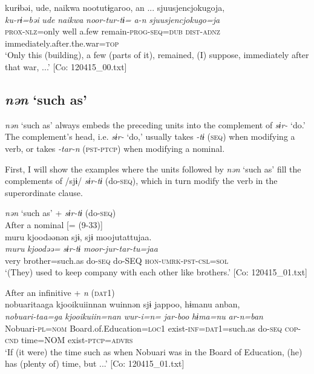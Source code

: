   \ex  %
      \glll    kurɨbəi,  ude,  naikwa  nootutɨgaroo,  an ...  {\textbar}sjuusjencjokugo{\textbar}ja,\\
      \textit{ku-rɨ=bəi}  \textit{ude}  \textit{naikwa}  \textit{noor-tur-tɨ=}  \textit{a-n} {} \textit{sjuusjencjokugo=ja}\\
      \textsc{prox}-\textsc{nlz}=only  well  a.few  remain-\textsc{prog}-\textsc{seq}=\textsc{dub} {} \textsc{dist}-\textsc{adnz}  immediately.after.the.war=\textsc{top}        \\
      \glt       ‘Only this (building), a few (parts of it), remained, (I) suppose, immediately after that war, ...’ [Co: 120415\_00.txt]
    \z
\z

\subsection{\textit{nən} ‘such as’}\label{sec:10.4.4}

\textit{nən} ‘such as’ always embeds the preceding units into the complement of \textit{sɨr-} ‘do.’ The complement’s head, i.e. \textit{sɨr-} ‘do,’ usually takes \textit{{}-tɨ} (\textsc{seq}) when modifying a verb, or takes \textit{-tar-n} (\textsc{pst}-\textsc{ptcp}) when modifying a nominal.

  First, I will show the examples where the units followed by \textit{nən} ‘such as’ fill the complements of /sjɨ/ \textit{sɨr-tɨ} (do-\textsc{seq}), which in turn modify the verb in the superordinate clause.

\ea\label{ex:10.85}   \textit{nən} ‘such as’ + \textit{sɨr-tɨ} (do-\textsc{seq})\\
  \ea After a nominal [= (9-33)]\\
      \glll    muru  kjoodəənən  sjɨ,  sjɨ  moojutattujaa.\\
    \textit{muru}  \textit{kjoodəə=}  \textit{}  \textit{sɨr-tɨ}  \textit{moor-jur-tar-tu=jaa}\\
    very  brother=such.as  do-\textsc{seq}  do-SEQ  \textsc{hon}-\textsc{umrk}-\textsc{pst}-\textsc{csl}=\textsc{sol}\\
\glt     ‘(They) used to keep company with each other like brothers.’  [Co: 120415\_01.txt]

  \ex After an infinitive + \textit{n} (\textsc{dat}1)\\
      \glll    nobuaritaaga  {\textbar}kjooikuiin{\textbar}nan  wuinnən  sjɨ  jappoo,  hɨmanu  anban,\\
    \textit{nobuari-taa=ga}  \textit{kjooikuiin=nan}  \textit{wur-i=n=}  \textit{}  \textit{jar-boo}  \textit{hɨma=nu}  \textit{ar-n=ban}\\
    Nobuari-\textsc{pl}=\textsc{nom}  Board.of.Education=\textsc{loc}1  exist-\textsc{inf}=\textsc{dat}1=such.as  do-\textsc{seq}  \textsc{cop}-\textsc{cnd}  time=NOM  exist-\textsc{ptcp}=\textsc{advrs}\\
\glt     ‘If (it were) the time such as when Nobuari was in the Board of Education, (he) has (plenty of) time, but ...’  [Co: 120415\_01.txt]

